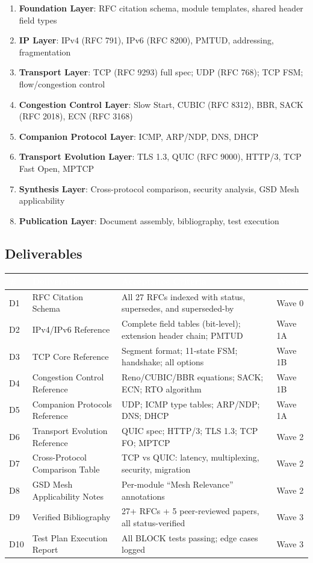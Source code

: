 \documentclass[11pt,letterpaper]{article}
\newcommand{\tableheader}[1]{\textbf{\sffamily\textcolor{white}{#1}}}
\begin{document}
\begin{enumerate}
  \item \textbf{Foundation Layer}: RFC citation schema, module templates, shared header field types
  \item \textbf{IP Layer}: IPv4 (RFC 791), IPv6 (RFC 8200), PMTUD, addressing, fragmentation
  \item \textbf{Transport Layer}: TCP (RFC 9293) full spec; UDP (RFC 768); TCP FSM; flow/congestion control
  \item \textbf{Congestion Control Layer}: Slow Start, CUBIC (RFC 8312), BBR, SACK (RFC 2018), ECN (RFC 3168)
  \item \textbf{Companion Protocol Layer}: ICMP, ARP/NDP, DNS, DHCP
  \item \textbf{Transport Evolution Layer}: TLS 1.3, QUIC (RFC 9000), HTTP/3, TCP Fast Open, MPTCP
  \item \textbf{Synthesis Layer}: Cross-protocol comparison, security analysis, GSD Mesh applicability
  \item \textbf{Publication Layer}: Document assembly, bibliography, test execution
\end{enumerate}

\subsection{Deliverables}

\begin{center}
\begin{tabularx}{\textwidth}{C{0.6cm}L{3.5cm}XL{2.5cm}}
\toprule
{}
\tableheader{\#} & \tableheader{Deliverable} & \tableheader{Acceptance Criteria} & \tableheader{Wave} \\
\midrule
D1 & RFC Citation Schema & All 27 RFCs indexed with status, supersedes, and superseded-by & Wave 0 \\
D2 & IPv4/IPv6 Reference & Complete field tables (bit-level); extension header chain; PMTUD & Wave 1A \\
D3 & TCP Core Reference & Segment format; 11-state FSM; handshake; all options & Wave 1B \\
D4 & Congestion Control Reference & Reno/CUBIC/BBR equations; SACK; ECN; RTO algorithm & Wave 1B \\
D5 & Companion Protocols Reference & UDP; ICMP type tables; ARP/NDP; DNS; DHCP & Wave 1A \\
D6 & Transport Evolution Reference & QUIC spec; HTTP/3; TLS 1.3; TCP FO; MPTCP & Wave 2 \\
D7 & Cross-Protocol Comparison Table & TCP vs QUIC: latency, multiplexing, security, migration & Wave 2 \\
D8 & GSD Mesh Applicability Notes & Per-module ``Mesh Relevance'' annotations & Wave 2 \\
D9 & Verified Bibliography & 27+ RFCs + 5 peer-reviewed papers, all status-verified & Wave 3 \\
D10 & Test Plan Execution Report & All BLOCK tests passing; edge cases logged & Wave 3 \\
\bottomrule
\end{tabularx}
\end{center}
\end{document}

